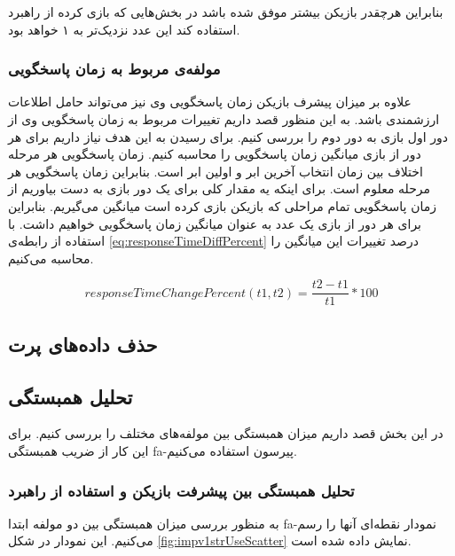\documentclass[twoside, a4paper,11pt]{book}
\numberwithin{equation}{chapter}
\numberwithin{table}{chapter}
\numberwithin{figure}{chapter}
\numberwithin{equation}{chapter}
\newcommand{\mls}[1]{\gls{fa-#1}\glsuseri{la-#1}}
\begin{document}
بنابراین هرچقدر بازیکن بیشتر موفق شده باشد در بخش‌هایی که بازی کرده از راهبرد استفاده کند این عدد نزدیک‌تر به ۱ خواهد بود.

\subsubsection{مولفه‌ی مربوط به زمان پاسخگویی}
علاوه بر میزان پیشرف بازیکن زمان پاسخگویی وی نیز می‌تواند حامل اطلاعات ارزشمندی باشد. به این منظور قصد داریم تغییرات مربوط به زمان پاسخگویی وی از دور اول بازی به دور دوم را بررسی کنیم. برای رسیدن به این هدف نیاز داریم برای هر دور از بازی میانگین زمان پاسخگویی را محاسبه کنیم. زمان پاسخگویی هر مرحله اختلاف بین زمان انتخاب آخرین ابر و اولین ابر است. بنابراین زمان پاسخگویی هر مرحله معلوم است. برای اینکه یه مقدار کلی برای یک دور بازی به دست بیاوریم از زمان پاسخگویی تمام مراحلی که بازیکن بازی کرده است میانگین می‌گیریم. بنابراین برای هر دور از بازی یک عدد به عنوان میانگین زمان پاسخگویی خواهیم داشت. با استفاده از رابطه‌ی \ref{eq:responseTimeDiffPercent} درصد تغییرات این میانگین را محاسبه می‌کنیم.

\begin{equation}
\label{eq:responseTimeDiffPercent}
	responseTimeChangePercent(t1, t2) = \frac{t2 - t1}{t1}*100
\end{equation}

\subsection{حذف داده‌های پرت} \label{removeOutlierSection}


\subsection{تحلیل همبستگی}
در این بخش قصد داریم میزان همبستگی بین مولفه‌های مختلف را بررسی کنیم. برای این کار از ضریب همبستگی  \mls{پیرسون} استفاده می‌کنیم.
\subsubsection{تحلیل همبستگی بین پیشرفت بازیکن و استفاده از راهبرد}

به منظور بررسی میزان همبستگی بین دو مولفه ابتدا \mls{نمودار نقطه‌ای} آنها را رسم می‌کنیم. این نمودار در شکل \ref{fig:impv1strUseScatter} نمایش داده شده است.
\end{document}
